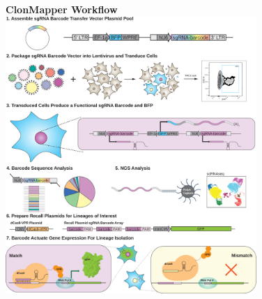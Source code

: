 \begin{figure}[h]
\centering
\textbf{ClonMapper Workflow} \\
\vspace{10pt}
\includegraphics[width=0.85\textwidth]{data/figures/clonmapper.pdf}
\end{figure}
\newpage
